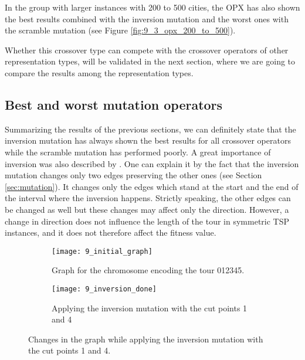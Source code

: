 In the group with larger instances with 200 to 500 cities, the OPX has also shown the best results combined with the inversion mutation and the worst ones with the scramble mutation (see Figure \ref{fig:9_3_opx_200_to_500}).\par 

Whether this crossover type can compete with the crossover operators of other representation types, will be validated in the next section, where we are going to compare the results among the representation types.\par 

\subsection{Best and worst mutation operators}
\label{subsec:experiments_mutation}

Summarizing the results of the previous sections, we can definitely state that the inversion mutation has always shown the best results for all crossover operators while the scramble mutation has performed poorly. A great importance of inversion was also described by \citeauthor{potvin1996genetic} \cite{potvin1996genetic}. One can explain it by the fact that the inversion mutation changes only two edges preserving the other ones (see Section \ref{sec:mutation}). It changes only the edges which stand at the start and the end of the interval where the inversion happens. Strictly speaking, the other edges can be changed as well but these changes may affect only the direction. However, a change in direction does not influence the length of the tour in symmetric TSP instances, and it does not therefore affect the fitness value. \par 

\begin{figure}[htp] \centering
	\begin{subfigure}[t]{0.45\textwidth}
		\texttt{[image: 9\_initial\_graph]}
		\caption{Graph for the chromosome encoding the tour 012345.}
		\label{fig:9_initial_graph_1}
	\end{subfigure}
	\hfill
	\begin{subfigure}[t]{0.45\textwidth}
		\centering
		\texttt{[image: 9\_inversion\_done]}
		\caption{Applying the inversion mutation with the cut points 1 and 4}
		\label{fig:9_inversion_done}
	\end{subfigure}	
	\caption{Changes in the graph while applying the inversion mutation with the cut points 1 and 4.}
	\label{fig:9_inversion_changes_graph}
\end{figure}


